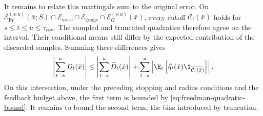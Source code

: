 It remains to relate this martingale sum to the original error. On
$\mathcal E_{\mathrm{Fr}}^{(s:u)}(\bar{x};S)
    \cap\mathcal E_{\mathrm{noise}}\cap\mathcal E_{\mathrm{gauge}}
    \cap\mathcal E_G^{(s:u)}(\bar{x})$, every cutoff $\mathcal C_t(\bar{x})$
holds for $s\leq t\leq u\leq\tau_{\mathrm{cov}}$.
The sampled and truncated quadratics therefore agree on the interval.
Their conditional means still differ by the expected contribution of
the discarded samples. Summing these differences gives
\begin{align}
    \left|\sum_{t=s}^{u}D_t(\bar{x})\right|
    \leq\left|\sum_{t=s}^{u}\widetilde D_t(\bar{x})\right|
    +\sum_{t=s}^{u}\left|
    \E_t\left[\widehat q_t(\bar{x})
        \1_{\overline{\mathcal C_t(\bar{x})}}\right]\right|.
    \label{eq:truncation-bias-decomposition}
\end{align}
On this intersection, under the preceding stopping and radius conditions
and the feedback budget above, the first term is bounded by
\eqref{eq:freedman-quadratic-bound}. It remains to bound the second term,
the bias introduced by truncation.





